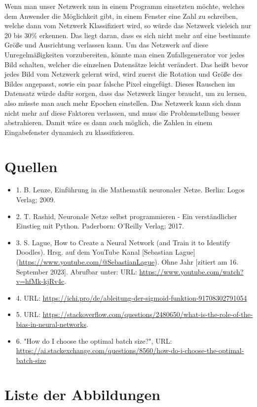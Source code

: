 \documentclass[12pt]{article}
\begin{document}
Wenn man unser Netzwerk nun in einem Programm einsetzten möchte, welches dem Anwender die Möglichkeit gibt, in einem Fenster eine Zahl zu schreiben, welche dann vom Netzwerk Klassifiziert wird, so würde das Netzwerk vieleich nur 20 bis 30\% erkennen. Das liegt daran, dass es sich nicht mehr auf eine bestimmte Größe und Ausrichtung verlassen kann. Um das Netzwerk auf diese Unregelmäßigkeiten vorzubereiten, könnte man einen Zufallsgenerator vor jedes Bild schalten, welcher die einzelnen Datensätze leicht verändert. Das heißt bevor jedes Bild vom Netzwerk gelernt wird, wird zuerst die Rotation und Größe des Bildes angepasst, sowie ein paar falsche Pixel eingefügt. Dieses Rauschen im Datensatz würde dafür sorgen, dass das Netzwerk länger braucht, um zu lernen, also müsste man auch mehr Epochen einstellen. Das Netzwerk kann sich dann nicht mehr auf diese Faktoren verlassen, und muss die Problemstellung besser abstrahieren. Damit wäre es dann auch möglich, die Zahlen in einem Eingabefenster dynamisch zu klassifizieren.\\


\cleardoublepage
\sloppy
\section{Quellen}
\begin{itemize}
\item 1. B. Lenze, Einführung in die Mathematik neuronaler Netze. Berlin: Logos Verlag; 2009.
\item 2. T. Rashid, Neuronale Netze selbst programmieren - Ein verständlicher Einstieg mit Python. Paderborn: O’Reilly Verlag; 2017.
\item 3. S. Lague, How to Create a Neural Network (and Train it to Identify Doodles). Hrsg. auf dem YouTube Kanal [Sebastian Lague](\url{https://www.youtube.com/@SebastianLague}). Ohne Jahr [zitiert am 16. September 2023]. Abrufbar unter: URL: \url{https://www.youtube.com/watch?v=hfMk-kjRv4c}.
\item 4. URL: \url{https://ichi.pro/de/ableitung-der-sigmoid-funktion-91708302791054}
\item 5. URL: \url{https://stackoverflow.com/questions/2480650/what-is-the-role-of-the-bias-in-neural-networks}.
\item 6. "How do I choose the optimal batch size?", URL: \url{https://ai.stackexchange.com/questions/8560/how-do-i-choose-the-optimal-batch-size}
\end{itemize}

\cleardoublepage
\section{Liste der Abbildungen}
\listoffigures
\end{document}
